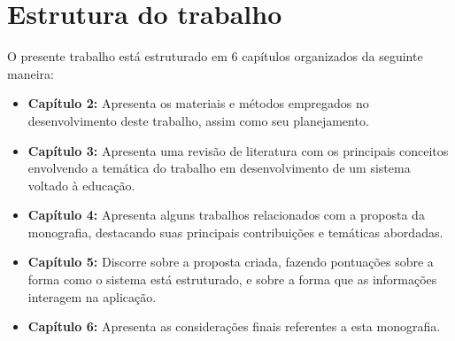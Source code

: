 \section{Estrutura do trabalho}
\label{sec:estruturaDoTrabalho}

O presente trabalho está estruturado em 6 capítulos organizados da seguinte maneira:

\begin{itemize}
    \item \textbf{Capítulo 2:} Apresenta os materiais e métodos empregados no desenvolvimento deste trabalho, assim como seu planejamento.
    \item \textbf{Capítulo 3:} Apresenta uma revisão de literatura com os principais conceitos envolvendo a temática do trabalho em desenvolvimento de  um sistema voltado à educação.
    \item \textbf{Capítulo 4:} Apresenta alguns trabalhos relacionados com a proposta da monografia, destacando suas principais contribuições e temáticas abordadas.
    \item \textbf{Capítulo 5:} Discorre sobre a proposta criada, fazendo pontuações sobre a forma como o sistema está estruturado, e sobre a forma que as informações interagem na aplicação.
    \item \textbf{Capítulo 6:} Apresenta as considerações finais referentes a esta monografia.

\end{itemize}